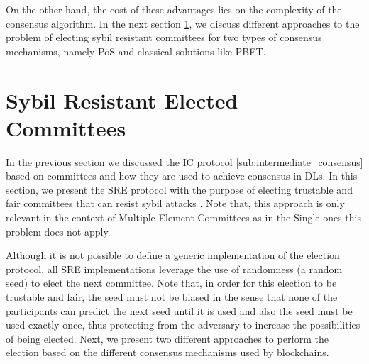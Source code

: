 On the other hand, the cost of these advantages lies on the complexity of the consensus algorithm. In the next section \ref{sec:rel_work:sybil_committees}, we discuss different approaches to the problem of electing sybil resistant committees for two types of consensus mechanisms, namely \gls{PoS} and classical solutions like \gls{PBFT}.

% 
% 
% 


\section{Sybil Resistant Elected Committees}
\label{sec:rel_work:sybil_committees}



In the previous section we discussed the \gls{IC} protocol \ref{sub:intermediate_consensus} based on committees and how they are used to achieve consensus in \gls{DL}s. In this section, we present the \gls{SRE} protocol with the purpose of electing trustable and fair committees that can resist sybil attacks \cite{sybil_attack}. Note that, this approach is only relevant in the context of Multiple Element Committees as in the Single ones this problem does not apply.  %

Although it is not possible to define a generic implementation of the election protocol, all \gls{SRE} implementations leverage the use of randomness (a random seed) to elect the next committee. %
Note that, in order for this election to be trustable and fair, the seed must not be biased in the sense that none of the participants can predict the next seed until it is used and also the seed must be used exactly once, thus protecting from the adversary to increase the possibilities of being elected. Next, we present two different approaches to perform the election based on the different consensus mechanisms used by blockchains.

